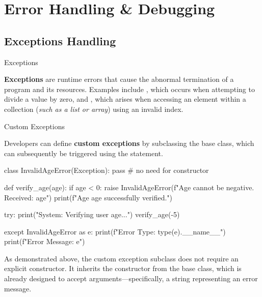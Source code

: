 \documentclass[10pt]{article}
\begin{document}
\section{Error Handling \& Debugging}

  \subsection{Exceptions Handling}

    \begin{core}{Exceptions}

      \textbf{Exceptions} are runtime errors that cause the abnormal termination of a program and its resources. Examples include , which occurs when attempting to divide a value by zero, and , which arises when accessing an element within a collection (\textit{such as a list or array}) using an invalid index.

    \end{core}

    \begin{core}{Custom Exceptions}

      Developers can define \textbf{custom exceptions} by subclassing the base  class, which can subsequently be triggered using the  statement.

      \begin{pyconsole}

        class InvalidAgeError(Exception):
            pass # no need for constructor

        def verify_age(age):
            if age < 0:
                raise InvalidAgeError(f"Age cannot be negative. Received: {age}")
            print(f"Age {age} successfully verified.")

        try:
            print("System: Verifying user age...")
            verify_age(-5)
            
        except InvalidAgeError as e:
            print(f"Error Type: {type(e).__name__}")
            print(f"Error Message: {e}")

      \end{pyconsole}

      As demonstrated above, the custom exception subclass does not require an explicit constructor. It inherits the constructor from the base  class, which is already designed to accept arguments---specifically, a string representing an error message.

    \end{core}
\end{document}
